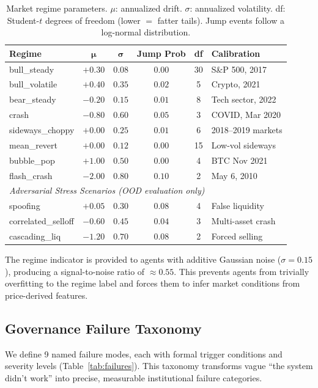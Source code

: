 \documentclass[11pt]{article}
\begin{document}
\begin{table}[h]
\centering
\small
\begin{tabular}{@{}lccccl@{}}
\toprule
\textbf{Regime} & $\boldsymbol{\mu}$ & $\boldsymbol{\sigma}$ & \textbf{Jump Prob} & \textbf{df} & \textbf{Calibration} \\ \midrule
bull\_steady       & $+0.30$ & $0.08$ & $0.00$ & 30 & S\&P 500, 2017 \\
bull\_volatile     & $+0.40$ & $0.35$ & $0.02$ &  5 & Crypto, 2021 \\
bear\_steady       & $-0.20$ & $0.15$ & $0.01$ &  8 & Tech sector, 2022 \\
crash              & $-0.80$ & $0.60$ & $0.05$ &  3 & COVID, Mar 2020 \\
sideways\_choppy   & $+0.00$ & $0.25$ & $0.01$ &  6 & 2018--2019 markets \\
mean\_revert       & $+0.00$ & $0.12$ & $0.00$ & 15 & Low-vol sideways \\
bubble\_pop        & $+1.00$ & $0.50$ & $0.00$ &  4 & BTC Nov 2021 \\
flash\_crash       & $-2.00$ & $0.80$ & $0.10$ &  2 & May 6, 2010 \\ \midrule
\multicolumn{6}{l}{\textit{Adversarial Stress Scenarios (OOD evaluation only)}} \\
spoofing           & $+0.05$ & $0.30$ & $0.08$ &  4 & False liquidity \\
correlated\_selloff & $-0.60$ & $0.45$ & $0.04$ &  3 & Multi-asset crash \\
cascading\_liq     & $-1.20$ & $0.70$ & $0.08$ &  2 & Forced selling \\
\bottomrule
\end{tabular}
\caption{Market regime parameters. $\mu$: annualized drift. $\sigma$: annualized volatility. df: Student-$t$ degrees of freedom (lower $=$ fatter tails). Jump events follow a log-normal distribution.}
\label{tab:regimes}
\end{table}

The regime indicator is provided to agents with additive Gaussian noise ($\sigma=0.15$), producing a signal-to-noise ratio of $\approx 0.55$. This prevents agents from trivially overfitting to the regime label and forces them to infer market conditions from price-derived features.

\subsection{Governance Failure Taxonomy}
\label{sec:failure_taxonomy}
We define 9 named failure modes, each with formal trigger conditions and severity levels (Table~\ref{tab:failures}). This taxonomy transforms vague ``the system didn't work'' into precise, measurable institutional failure categories.
\end{document}
